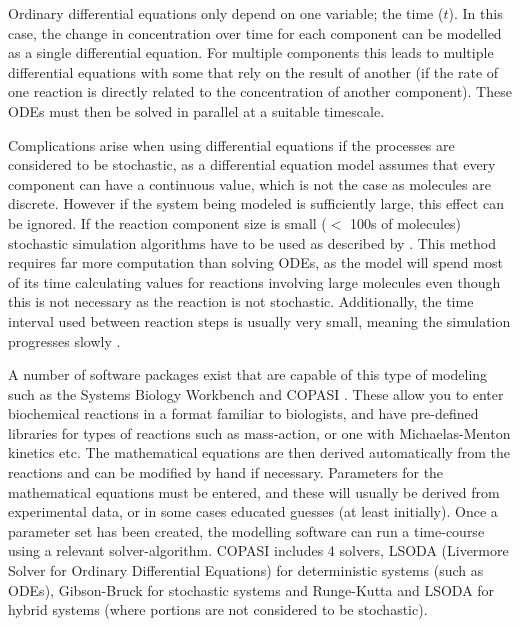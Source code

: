 Ordinary differential equations only depend on one variable; the time ($t$). In this case, the change in concentration over time for each component can be modelled as a single differential equation. For multiple components this leads to multiple differential equations with some that rely on the result of another (if the rate of one reaction is directly related to the concentration of another component). These ODEs must then be solved in parallel at a suitable timescale.

Complications arise when using differential equations if the processes are considered to be stochastic, as a differential equation model assumes that every component can have a continuous value, which is not the case as molecules are discrete. However if the system being modeled is sufficiently large, this effect can be ignored. If the reaction component size is small ($<$ 100s of molecules) stochastic simulation algorithms have to be used as described by \citet{Gillespie1977}. This method requires far more computation than solving ODEs, as the model will spend most of its time calculating values for reactions involving large molecules even though this is not necessary as the reaction is not stochastic. Additionally, the time interval used between reaction steps is usually very small, meaning the simulation progresses slowly \cite{Klipp2005}.

A number of software packages exist that are capable of this type of modeling such as the Systems Biology Workbench \cite{Sauro2003} and COPASI \cite{StefanHoops12152006}. These allow you to enter biochemical reactions in a format familiar to biologists, and have pre-defined libraries for types of reactions such as mass-action, or one with Michaelas-Menton kinetics etc. The mathematical equations are then derived automatically from the reactions and can be modified by hand if necessary. Parameters for the mathematical equations must be entered, and these will usually be derived from experimental data, or in some cases educated guesses (at least initially). Once a parameter set has been created, the modelling software can run a time-course using a relevant solver-algorithm. COPASI includes 4 solvers,  LSODA (Livermore Solver for Ordinary Differential Equations) \cite{RH93} for deterministic systems (such as ODEs), Gibson-Bruck \cite{Gibson2000} for stochastic systems and Runge-Kutta and LSODA for hybrid systems (where portions are not considered to be stochastic).
